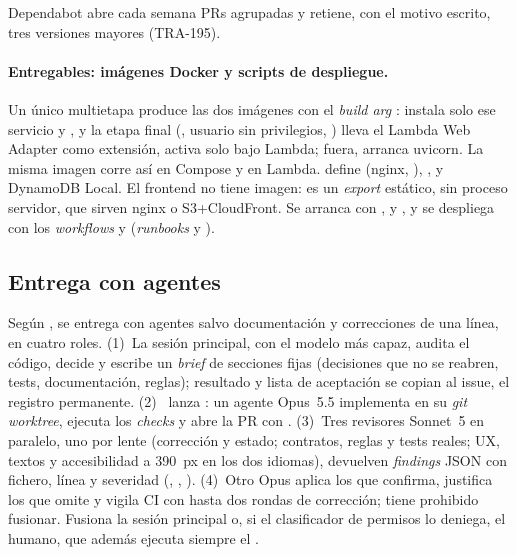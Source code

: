 Dependabot abre cada semana PRs agrupadas y retiene, con el motivo escrito, tres versiones
mayores (TRA-195).

\paragraph{Entregables: imágenes Docker y scripts de despliegue.} Un único
 multietapa produce las dos imágenes con el \emph{build arg}
:  instala solo ese servicio y , y la etapa
final (, usuario sin privilegios, ) lleva el Lambda Web
Adapter como extensión, activa solo bajo Lambda; fuera,  arranca uvicorn.
La misma imagen corre así en Compose y en Lambda.  define 
(nginx, ), ,  y DynamoDB Local. El frontend no
tiene imagen: es un \emph{export} estático, sin proceso servidor, que sirven nginx o S3+CloudFront.
Se arranca con ,  y , y se despliega con los
\emph{workflows} y  (\emph{runbooks}  y ).

\subsection{Entrega con agentes}
Según , se entrega con agentes salvo documentación y correcciones de una línea,
en cuatro roles. (1)~La sesión principal, con el
modelo más capaz, audita el código, decide y escribe un \emph{brief} de secciones fijas
(decisiones que no se reabren, tests, documentación, reglas); resultado y lista de aceptación se
copian al issue, el registro permanente. (2)~ lanza
: un agente Opus~5.5 implementa en su \emph{git worktree},
ejecuta los \emph{checks} y abre la PR con . (3)~Tres revisores Sonnet~5 en
paralelo, uno por lente (corrección y estado; contratos, reglas y tests reales; UX, textos y
accesibilidad a 390~px en los dos idiomas), devuelven \emph{findings} JSON con fichero, línea y
severidad (, , ). (4)~Otro Opus aplica los que confirma,
justifica los que omite y vigila CI con hasta dos rondas de corrección; tiene prohibido fusionar.
Fusiona la sesión principal o, si el clasificador de permisos lo deniega, el humano, que además
ejecuta siempre el .

